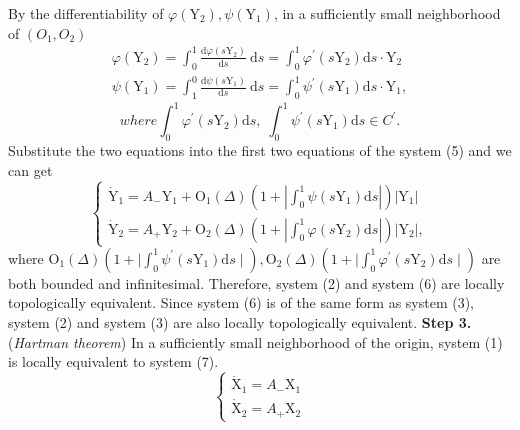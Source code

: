 \documentclass[11pt]{diazessay} %
\begin{document}
\noindent
By the differentiability of $\varphi\left(\mathrm{Y}_2\right), \psi\left(\mathrm{Y}_1\right)$, in a sufficiently small neighborhood of $\left(O_1, O_2\right)$
\begin{equation*}
	\begin{aligned}
		\varphi\left(\mathrm{Y}_2\right)=\int_0^1 \frac{\mathrm{d} \varphi\left(s \mathrm{Y}_2\right)}{\mathrm{d} s} \mathrm{~d} s=\int_0^1 \varphi^{\prime}\left(s \mathrm{Y}_2\right) \mathrm{d} s \cdot \mathrm{Y}_2\\
        \psi\left(\mathrm{Y}_1\right)=\int_1^0 \frac{\mathrm{d} \psi\left(s \mathrm{Y}_1\right)}{\mathrm{d} s} \mathrm{~d} s=\int_0^1 \psi^{\prime}\left(s \mathrm{Y}_1\right) \mathrm{d} s \cdot \mathrm{Y}_1 ,
	\end{aligned}
\end{equation*}
$$where \int_0^1{\varphi}^{\prime}\left(s \mathrm{Y}_2\right) \mathrm{d} s, \; \int_0^1 \psi^{\prime}\left(s \mathrm{Y}_1\right) \mathrm{d} s \in C^{\prime}.$$
Substitute the two equations into the first two equations of the system (5) and we can get 
\begin{equation}
	\left\{\begin{array}{l}
		\dot{\mathrm{Y}}_1=A_{-} \mathrm{Y}_1+\mathrm{O}_1(\Delta)\left(1+\left|\int_0^1 {\psi}\left(s \mathrm{Y}_1\right) \mathrm{d} s\right|\right)\left|\mathrm{Y}_1\right|\\
        \dot{\mathrm{Y}}_2=A_{+} \mathrm{Y}_2+\mathrm{O}_2(\Delta)\left(1+\left|\int_0^1 {\varphi}\left(s \mathrm{Y}_2\right) \mathrm{d} s\right|\right)\left|\mathrm{Y}_2\right|,
	\end{array}\right.
\end{equation}
\noindent
where $\mathrm{O}_1(\Delta)\left(1+\mid \int_0^1 \psi^{\prime}\left(s \mathrm{Y}_1\right) \mathrm{d} s\mid\right), \mathrm{O}_2(\Delta)\left(1+\mid \int_0^1 {\varphi}^{\prime}\left(s \mathrm{Y}_2\right) \mathrm{d} s\mid\right)$ are both bounded and infinitesimal.
Therefore, system (2) and system (6) are locally topologically equivalent. Since system (6) is of the same form as system (3), system (2) and system (3) are also locally topologically equivalent.
\vskip 8pt
\textbf{Step 3. }(\textit{Hartman theorem}) In a sufficiently small neighborhood of the origin, system (1) is locally equivalent to system (7).
\begin{equation}
	\left\{\begin{array}{l}\dot{\mathrm{X}}_1=A_{-} \mathrm{X}_1 \\ \dot{\mathrm{X}}_2=A_{+} \mathrm{X}_2\end{array}\right.
\end{equation}
\end{document}
